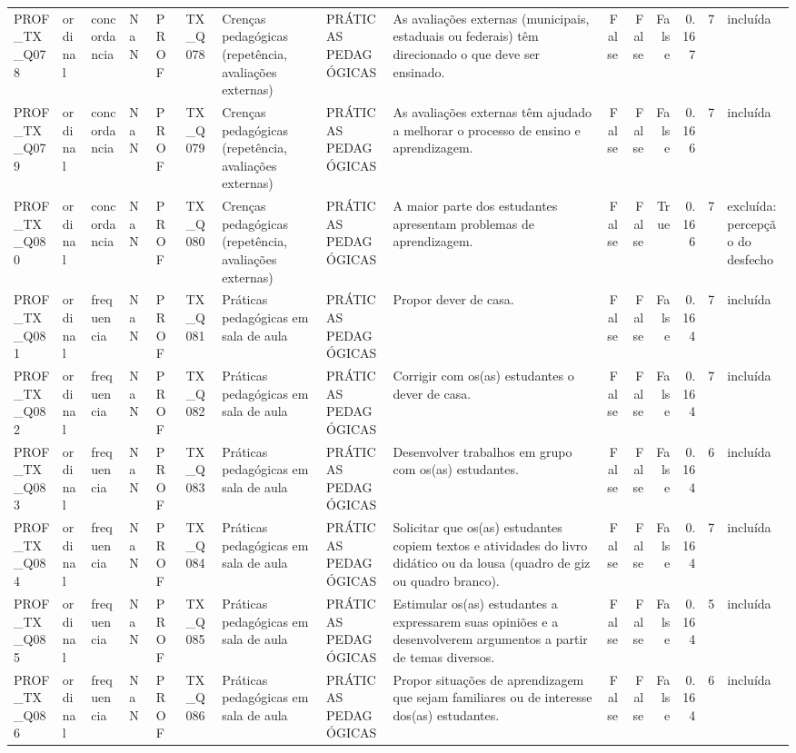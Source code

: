 \begin{tabular}{lllllllllrrrrrl}
PROF\_TX\_Q078 & ordinal & concordancia & NaN & PROF & TX\_Q078 & Crenças pedagógicas (repetência, avaliações externas) & PRÁTICAS PEDAGÓGICAS & As avaliações externas (municipais, estaduais ou federais) têm direcionado o que deve ser ensinado. & False & False & False & 0.167 & 7 & incluída \\
PROF\_TX\_Q079 & ordinal & concordancia & NaN & PROF & TX\_Q079 & Crenças pedagógicas (repetência, avaliações externas) & PRÁTICAS PEDAGÓGICAS & As avaliações externas têm ajudado a melhorar o processo de ensino e aprendizagem. & False & False & False & 0.166 & 7 & incluída \\
PROF\_TX\_Q080 & ordinal & concordancia & NaN & PROF & TX\_Q080 & Crenças pedagógicas (repetência, avaliações externas) & PRÁTICAS PEDAGÓGICAS & A maior parte dos estudantes apresentam problemas de aprendizagem. & False & False & True & 0.166 & 7 & excluída: percepção do desfecho \\
PROF\_TX\_Q081 & ordinal & frequencia & NaN & PROF & TX\_Q081 & Práticas pedagógicas em sala de aula & PRÁTICAS PEDAGÓGICAS & Propor dever de casa. & False & False & False & 0.164 & 7 & incluída \\
PROF\_TX\_Q082 & ordinal & frequencia & NaN & PROF & TX\_Q082 & Práticas pedagógicas em sala de aula & PRÁTICAS PEDAGÓGICAS & Corrigir com os(as) estudantes o dever de casa. & False & False & False & 0.164 & 7 & incluída \\
PROF\_TX\_Q083 & ordinal & frequencia & NaN & PROF & TX\_Q083 & Práticas pedagógicas em sala de aula & PRÁTICAS PEDAGÓGICAS & Desenvolver trabalhos em grupo com os(as) estudantes. & False & False & False & 0.164 & 6 & incluída \\
PROF\_TX\_Q084 & ordinal & frequencia & NaN & PROF & TX\_Q084 & Práticas pedagógicas em sala de aula & PRÁTICAS PEDAGÓGICAS & Solicitar que os(as) estudantes copiem textos e atividades do livro didático ou da lousa (quadro de giz ou quadro branco). & False & False & False & 0.164 & 7 & incluída \\
PROF\_TX\_Q085 & ordinal & frequencia & NaN & PROF & TX\_Q085 & Práticas pedagógicas em sala de aula & PRÁTICAS PEDAGÓGICAS & Estimular os(as) estudantes a expressarem suas opiniões e a desenvolverem argumentos a partir de temas diversos. & False & False & False & 0.164 & 5 & incluída \\
PROF\_TX\_Q086 & ordinal & frequencia & NaN & PROF & TX\_Q086 & Práticas pedagógicas em sala de aula & PRÁTICAS PEDAGÓGICAS & Propor situações de aprendizagem que sejam familiares ou de interesse dos(as) estudantes. & False & False & False & 0.164 & 6 & incluída \\

\end{tabular}
